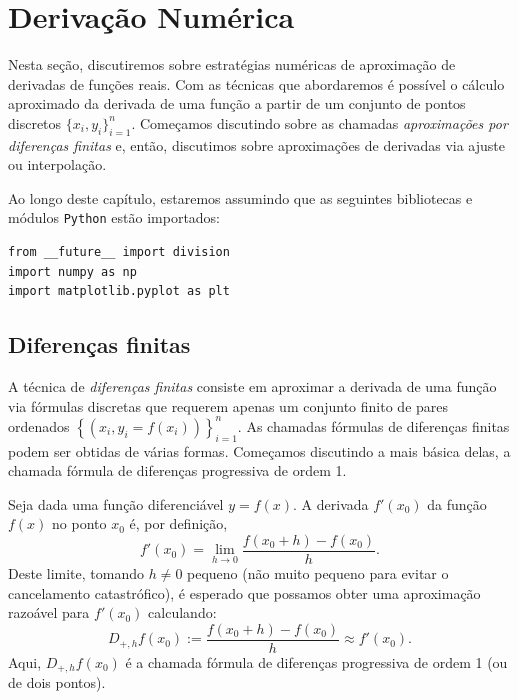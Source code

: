 
%

\chapter{Derivação Numérica}

Nesta seção, discutiremos sobre estratégias numéricas de aproximação de derivadas de funções reais. Com as técnicas que abordaremos é possível o cálculo aproximado da derivada de uma função a partir de um conjunto de pontos discretos $\{x_i, y_i\}_{i=1}^n$. Começamos discutindo sobre as chamadas \emph{aproximações por diferenças finitas} e, então, discutimos sobre aproximações de derivadas via ajuste ou interpolação.

\ifispython
Ao longo deste capítulo, estaremos assumindo que as seguintes bibliotecas e módulos \verb+Python+ estão importados:
\begin{verbatim}
from __future__ import division
import numpy as np
import matplotlib.pyplot as plt
\end{verbatim}
\fi

\section{Diferenças finitas}

A técnica de \emph{diferenças finitas} consiste em aproximar a derivada de uma função via fórmulas discretas que requerem apenas um conjunto finito de pares ordenados $\left\{\left(x_i, y_i=f(x_i)\right)\right\}_{i=1}^n$. As chamadas fórmulas de diferenças finitas podem ser obtidas de várias formas. Começamos discutindo a mais básica delas, a chamada fórmula de diferenças progressiva de ordem 1.

Seja dada uma função diferenciável $y = f(x)$. A derivada $f'(x_0)$ da função $f(x)$ no ponto $x_0$ é, por definição,
\begin{equation*}
  f'(x_0)=\lim_{h\to 0}\frac{f(x_0+h)-f(x_0)}{h}.
\end{equation*}
Deste limite, tomando $h\neq 0$ pequeno (não muito pequeno para evitar o cancelamento catastrófico), é esperado que possamos obter uma aproximação razoável para $f'(x_0)$ calculando:
\begin{equation}\label{eq:dp}
  D_{+,h}f(x_0) := \frac{f(x_0+h)-f(x_0)}{h} \approx f'(x_0).
\end{equation}
Aqui, $D_{+,h}f(x_0)$ é a chamada fórmula de diferenças progressiva de ordem 1 (ou de dois pontos).

